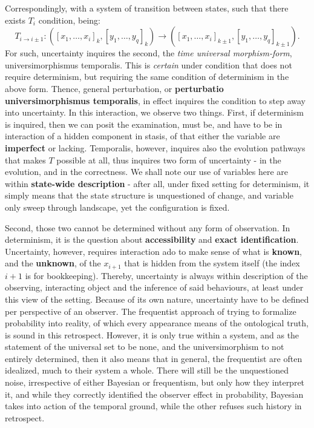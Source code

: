 Correspondingly, with a system of transition between states, such that there exists $T_{i}$ condition, being:
\begin{equation}
    T_{i\to i\pm 1} :([x_{1},\dots,x_{i}]_{k},[y_{1},\dots,y_{q}]_{k}) \to ([x_{1},\dots,x_{i}]_{k\pm 1},[y_{1},\dots,y_{q}]_{k\pm 1}).
\end{equation}
For such, uncertainty inquires the second, the \textit{time universal morphism-form}, universimorphismus temporalis. This is \textit{certain} under condition that does not require determinism, but requiring the same condition of determinism in the above form. Thence, general perturbation, or \textbf{perturbatio universimorphismus temporalis}, in effect inquires the condition to step away into uncertainty. In this interaction, we observe two things. First, if determinism is inquired, then we can posit the examination, must be, and have to be in interaction of a hidden component in stasis, of that either the variable are \textbf{imperfect} or lacking. Temporalis, however, inquires also the evolution pathways that makes $T$ possible at all, thus inquires two form of uncertainty - in the evolution, and in the correctness. We shall note our use of variables here are within \textbf{state-wide description} - after all, under fixed setting for determinism, it simply means that the state structure is unquestioned of change, and variable only sweep through landscape, yet the configuration is fixed. 

Second, those two cannot be determined without any form of observation. In determinism, it is the question about \textbf{accessibility} and \textbf{exact identification}. Uncertainty, however, requires interaction ado to make sense of what is \textbf{known}, and the \textbf{unknown}, of the $x_{i+1}$ that is hidden from the system itself (the index $i+1$ is for bookkeeping). Thereby, uncertainty is always within description of the observing, interacting object and the inference of said behaviours, at least under this view of the setting. Because of its own nature, uncertainty have to be defined per perspective of an observer. The frequentist approach of trying to formalize probability into reality, of which every appearance means of the ontological truth, is sound in this retrospect. However, it is only true within a system, and as the statement of the universal set to be none, and the universimorphism to not entirely determined, then it also means that in general, the frequentist are often idealized, much to their system a whole. There will still be the unquestioned noise, irrespective of either Bayesian or frequentism, but only how they interpret it, and while they correctly identified the observer effect in probability, Bayesian takes into action of the temporal ground, while the other refuses such history in retrospect. 

